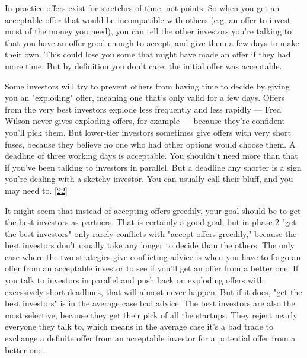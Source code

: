 In
                    practice offers exist for stretches of time, not points. So
                    when you get an acceptable offer that would be incompatible
                    with others (e.g. an offer to invest most of the money you
                    need), you can tell the other investors you're talking to
                    that you have an offer good enough to accept, and give them
                    a few days to make their own. This could lose you some that
                    might have made an offer if they had more time. But by
                    definition you don't care; the initial offer was
                    acceptable.

Some investors will try to prevent
                    others from having time to decide by giving you an
                    "exploding" offer, meaning one that's only valid for a few
                    days. Offers from the very best investors explode less
                    frequently and less rapidly --- Fred Wilson never gives
                    exploding offers, for example --- because they're
                    confident you'll pick them. But lower-tier investors
                    sometimes give offers with very short fuses, because they
                    believe no one who had other options would choose them. A
                    deadline of three working days is acceptable. You shouldn't
                    need more than that if you've been talking to investors in
                    parallel. But a deadline any shorter is a sign you're
                    dealing with a sketchy investor. You can usually call their
                    bluff, and you may need to.
                    [\href{\#f22n}{22}]

It might seem that instead of accepting offers
                    greedily, your goal should be to get the best investors as
                    partners. That is certainly a good goal, but in phase 2 "get
                    the best investors" only rarely conflicts with "accept
                    offers greedily," because the best investors don't usually
                    take any longer to decide than the others. The only case
                    where the two strategies give conflicting advice is when you
                    have to forgo an offer from an acceptable investor to see if
                    you'll get an offer from a better one. If you talk to
                    investors in parallel and push back on exploding offers with
                    excessively short deadlines, that will almost never happen.
                    But if it does, "get the best investors" is in the average
                    case bad advice. The best investors are also the most
                    selective, because they get their pick of all the startups.
                    They reject nearly everyone they talk to, which means in the
                    average case it's a bad trade to exchange a definite offer
                    from an acceptable investor for a potential offer from a
                    better one.

